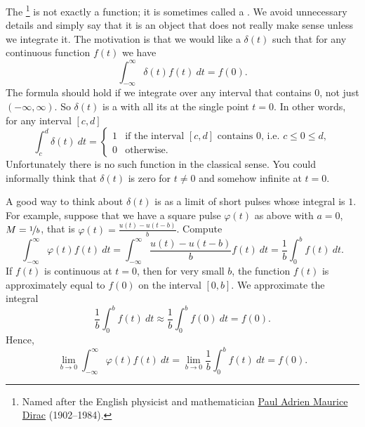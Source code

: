 The \emph{}%
\footnote{Named after the English physicist and mathematician
\href{https://en.wikipedia.org/wiki/Paul_Dirac}{Paul Adrien Maurice Dirac}
(1902--1984).}
is not exactly a function; it is sometimes called a
\emph{}.  We
avoid unnecessary details and simply say that it is an object
that does not really make sense unless we integrate it.  The motivation is
that we would like a  $\delta(t)$
such that 
for any continuous function $f(t)$ we have
\begin{equation*}
\boxed{~~
\int_{-\infty}^\infty \delta(t) f(t) ~dt = f(0) .
~~}
\end{equation*}
The formula should hold if we integrate over any interval that contains 0,
not just $(-\infty,\infty)$.
So $\delta(t)$ is a  
with all its  at the single point $t=0$.  In other words, for any
interval $[c,d]$
\begin{equation*}
\int_c^d \delta(t) ~dt = 
\begin{cases}
1 & \text{if the interval $[c,d]$ contains 0, i.e.\ } c \leq 0 \leq d, \\
0 & \text{otherwise.}
\end{cases}
\end{equation*}
Unfortunately there is no such function in the classical sense.  You could
informally think that $\delta(t)$ is zero for $t\not=0$ and somehow
infinite at $t=0$.

A good way to think about $\delta(t)$ is as a limit of short pulses
whose integral is $1$.  For example, suppose that
we have a square pulse $\varphi(t)$ as above with $a=0$,
$M=\nicefrac{1}{b}$, that is $\varphi(t) = \frac{u(t) - u(t-b)}{b}$.
Compute
\begin{equation*}
\int_{-\infty}^\infty \varphi(t) f(t) ~dt =
\int_{-\infty}^\infty \frac{u(t) - u(t-b)}{b} f(t) ~dt =
\frac{1}{b} \int_{0}^b f(t) ~dt .
\end{equation*}
If $f(t)$ is continuous at $t=0$, then
for very small $b$, the function $f(t)$ is approximately equal to $f(0)$ on
the interval $[0,b]$.  We approximate the integral
\begin{equation*}
\frac{1}{b} \int_{0}^b f(t) ~dt \approx
\frac{1}{b} \int_{0}^b f(0) ~dt = f(0) .
\end{equation*}
Hence,
\begin{equation*}
\lim_{b\to 0}
\int_{-\infty}^\infty \varphi(t) f(t) ~dt =
\lim_{b\to 0}
\frac{1}{b} \int_{0}^b f(t) ~dt  = f(0) .
\end{equation*}

